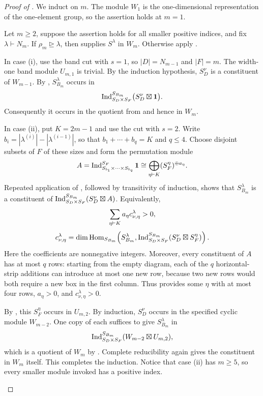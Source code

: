 \begin{proof}[Proof of ]
We induct on $m$. The module $W_1$ is the one-dimensional representation
of the one-element group, so the assertion holds at $m=1$.

Let $m\ge2$, suppose the assertion holds for all smaller positive indices,
and fix $\lambda\vdash N_m$. If $\rho_m\unrhd\lambda$, then
 supplies $S^\lambda$ in $W_m$. Otherwise apply
.

In case \textup{(i)}, use the band cut with $s=1$, so
$|D|=N_{m-1}$ and $|F|=m$. The width-one band module $U_{m,1}$ is
trivial. By the induction hypothesis, $S_D^\nu$ is a constituent of
$W_{m-1}$. By , $S_{B_m}^\lambda$ occurs in
\[
\operatorname{Ind}_{S_D\times S_F}^{S_{B_m}}
\bigl(S_D^\nu\boxtimes\mathbf1\bigr).
\]
Consequently it occurs in the quotient from 
and hence in $W_m$.

In case \textup{(ii)}, put $K=2m-1$ and use the cut with $s=2$.
Write $b_i=|\lambda^{(i)}|-|\lambda^{(i-1)}|$, so that
$b_1+\cdots+b_q=K$ and $q\le4$. Choose disjoint subsets of $F$ of
these sizes and form the permutation module
\[
A=\operatorname{Ind}_{S_{b_1}\times\cdots\times S_{b_q}}^{S_F}\mathbf1
  \cong\bigoplus_{\eta\vdash K}(S_F^\eta)^{\oplus a_\eta}.
\]
Repeated application of , followed by transitivity of
induction, shows that $S_{B_m}^\lambda$ is a constituent of
$\operatorname{Ind}_{S_D\times S_F}^{S_{B_m}}(S_D^\nu\boxtimes A)$. Equivalently,
\begin{equation}
\label{comb:positive-multiplicity}
\begin{gathered}
\sum_{\eta\vdash K}a_\eta c_{\nu,\eta}^{\lambda}>0,\\[3pt]
c_{\nu,\eta}^{\lambda}
=\dim\operatorname{Hom}_{S_{B_m}}\!\left(
 S_{B_m}^\lambda,
 \operatorname{Ind}_{S_D\times S_F}^{S_{B_m}}
 (S_D^\nu\boxtimes S_F^\eta)\right).
\end{gathered}
\end{equation}
Here the coefficients are nonnegative integers. Moreover, every
constituent of $A$ has at most $q$ rows: starting from the empty diagram,
each of the $q$ horizontal-strip additions can introduce at most one new
row, because two new rows would both require a new box in the first
column. Thus  provides some $\eta$ with
at most four rows, $a_\eta>0$, and $c_{\nu,\eta}^{\lambda}>0$.

\begin{samepage}
By , this $S_F^\eta$ occurs in $U_{m,2}$.
By induction, $S_D^\nu$ occurs in the specified cyclic module
$W_{m-2}$. One copy of each suffices to give $S_{B_m}^\lambda$ in
\[
\operatorname{Ind}_{S_D\times S_F}^{S_{B_m}}(W_{m-2}\boxtimes U_{m,2}),
\]
which is a quotient of $W_m$ by .
Complete reducibility again gives the constituent in $W_m$ itself.
This completes the induction. Notice that case \textup{(ii)} has
$m\ge5$, so every smaller module invoked has a positive index.
\end{samepage}
\end{proof}

